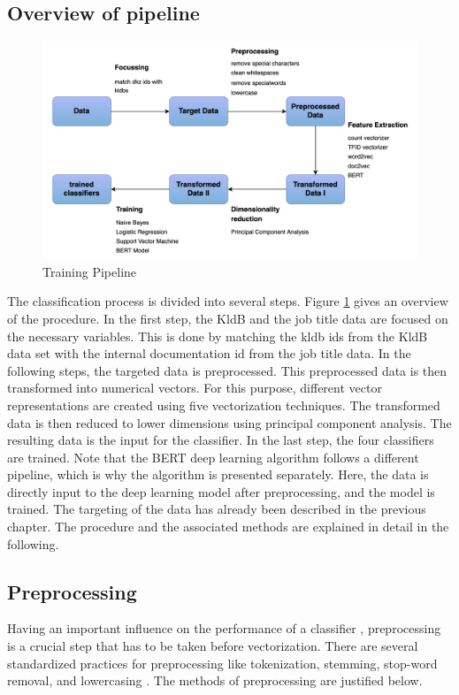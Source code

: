 \documentclass[12pt, a4paper, titlepage]{article}
\begin{document}
\subsection{Overview of pipeline}

\begin{figure}[]
  \center
  \includegraphics[scale=0.5]{pipeline_MA.png}
  \caption{\label{fig: F8} Training Pipeline}
\end{figure}

The classification process is divided into several steps. Figure \ref{fig: F8} gives an overview of the procedure. In the first step, the \ac{KldB} and the job title data are focused on the necessary variables. This is done by matching the kldb ids from the \ac{KldB} data set with the internal documentation id from the job title data. In the following steps, the targeted data is preprocessed. This preprocessed data is then transformed into numerical vectors. For this purpose, different vector representations are created using five vectorization techniques. The transformed data is then reduced to lower dimensions using principal component analysis. The resulting data is the input for the classifier. In the last step, the four classifiers are trained. Note that the \ac{BERT} deep learning algorithm follows a different pipeline, which is why the algorithm is presented separately. Here, the data is directly input to the deep learning model after preprocessing, and the model is trained. The targeting of the data has already been described in the previous chapter. The procedure and the associated methods are explained in detail in the following.

\subsection{Preprocessing}
Having an important influence on the performance of a classifier \citep{uysal2014, hacohen2020, gonccalves2005}, preprocessing is a crucial step that has to be taken before vectorization. There are several standardized practices for preprocessing like tokenization, stemming, stop-word removal, and lowercasing \citep{alsmadi2019}. The methods of preprocessing are justified below.
\end{document}

